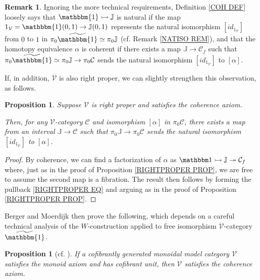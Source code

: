 \documentclass[a4paper,10pt
 ,final
]{article}%
\numberwithin{equation}{section}
\numberwithin{figure}{section}
\newtheorem{proposition}[equation]{Proposition}%
\theoremstyle{definition} %
\newtheorem{remark}[equation]{Remark}%
\newcommand{\V}{\ensuremath{\mathcal V}}
\newcommand{\1}{\ensuremath{\mathbbm 1}}%
\begin{document}
\begin{remark}
Ignoring the more technical requirements,
Definition \ref{COH DEF} loosely says that  
$\mathbbm{1} \rightarrowtail \mathbb{J}$
is natural if the map $1_{\V} = \mathbbm{1}(0,1) \to \mathbb{J}(0,1)$
represents the natural isomorphism
$[id_{1_{\V}}]$ from $0$ to $1$ in $ \pi_0 \widetilde{\mathbbm{1}} \simeq \pi_0 \mathbb{J}$ (cf. Remark \ref{NATISO REM}),
%
and that the homotopy equivalence $\alpha$ is coherent
if there exists a map $\mathbb{J} \to \mathcal C_f$
such that
$\pi_0 \widetilde{\mathbbm{1}} \simeq
\pi_0 \mathbb{J} \to \pi_0 \mathcal C$
sends the natural isomorphism $[id_{1_{\V}}]$ to $[\alpha]$.

If, in addition, $\V$ is also right proper, we can slightly strengthen this observation, as follows.
\end{remark}



\begin{proposition}\label{ALTCOH PROP}
Suppose $\V$ is right proper and satisfies the coherence axiom.

Then, for any $\V$-category $\mathcal{C}$ and isomorphism  
$[\alpha]$ in $\pi_0 \mathcal{C}$,
there exists a map from an interval 
$\mathbb{J} \to \mathcal{C}$
such that 
$\pi_0 \mathbb{J} \to \pi_0\mathcal{C}$
sends the natural isomorphism $[id_{1_{\V}}]$ to $[\alpha]$.
\end{proposition}



\begin{proof}
By coherence, we can find a factorization of 
$\alpha$ as 
$\1 \rightarrowtail \mathbb J \twoheadrightarrow \mathcal C_f$
where, just as in the proof of
Proposition \ref{RIGHTPROPER PROP},
we are free to assume the second map is a fibration.
The result then follows by forming the pullback \eqref{RIGHTPROPER EQ} and arguing as in the proof of Proposition \ref{RIGHTPROPER PROP}.
\end{proof}





Berger and Moerdijk then prove the following,
which depends on a careful technical analysis of the $W$-construction applied to free isomorphism $\V$-category
$\widetilde{\mathbbm{1}}$.



 

\begin{proposition}[{cf. \cite[Prop. 2.24]{BM13}}]
\label{COHAX PROP}
If a cofibrantly generated monoidal model category $\V$
satisfies the monoid axiom and has cofibrant unit,
then $\V$ satisfies the coherence axiom.
\end{proposition}
\end{document}
